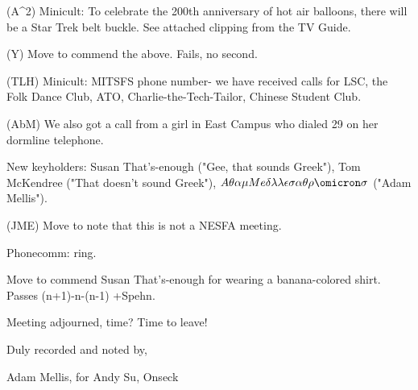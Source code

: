 \documentclass[12pt]{article}
\begin{document}
(A^2) Minicult: To celebrate the 200th anniversary of hot air balloons, there will be a Star Trek belt buckle. See attached clipping from the TV Guide.

(Y) Move to commend the above. Fails, no second.

(TLH) Minicult: MITSFS phone number- we have received calls for LSC, the Folk Dance Club, ATO, Charlie-the-Tech-Tailor, Chinese Student Club.

(AbM) We also got a call from a girl in East Campus who dialed 29 on her dormline telephone.

New keyholders: Susan That's-enough ("Gee, that sounds Greek"), Tom McKendree ("That doesn't sound Greek"), $A\theta\alpha\mu Me\delta\lambda\lambda\epsilon\sigma\alpha\theta\rho\omicron\sigma$ ("Adam Mellis").

(JME) Move to note that this is not a NESFA meeting.

Phonecomm: ring.

Move to commend Susan That's-enough for wearing a banana-colored shirt. Passes (n+1)-n-(n-1) +Spehn.

\vspace{12pt}

\noindent
Meeting adjourned, time? Time to leave!

\vspace{18pt}

\centerline{Duly recorded and noted by,}
\centerline{Adam Mellis, for Andy Su, Onseck}
\end{document}
